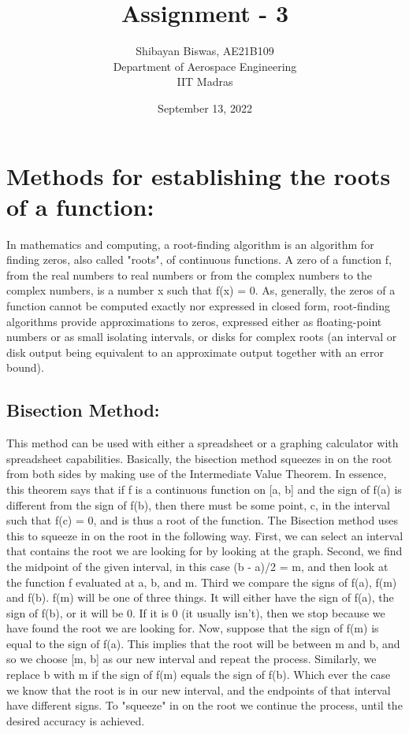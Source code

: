 \documentclass[12pt,a4paper]{article}
\author{Shibayan Biswas, AE21B109\\ Department of Aerospace Engineering\\ IIT Madras}
\title{Assignment - 3}
\date{September 13, 2022}
\begin{document}
\maketitle
\section{Methods for establishing the roots of a function:}
In mathematics and computing, a root-finding algorithm is an algorithm for finding zeros, also called "roots", of continuous functions. A zero of a function f, from the real numbers to real numbers or from the complex numbers to the complex numbers, is a number x such that f(x) = 0. As, generally, the zeros of a function cannot be computed exactly nor expressed in closed form, root-finding algorithms provide approximations to zeros, expressed either as floating-point numbers or as small isolating intervals, or disks for complex roots (an interval or disk output being equivalent to an approximate output together with an error bound).
\subsection{Bisection Method:}
This method can be used with either a spreadsheet or a graphing calculator with spreadsheet capabilities. Basically, the bisection method squeezes in on the root from both sides by making use of the Intermediate Value Theorem. In essence, this theorem says that if f is a continuous function on [a, b] and the sign of f(a) is different from the sign of f(b), then there must be some point, c, in the interval such that f(c) = 0, and is thus a root of the function. The Bisection method uses this to squeeze in on the root in the following way. First, we can select an interval that contains the root we are looking for by looking at the graph. Second, we find the midpoint of the given interval, in this case (b - a)/2 = m, and then look at the function f evaluated at a, b, and m. Third we compare the signs of f(a), f(m) and f(b). f(m) will be one of three things. It will either have the sign of f(a), the sign of f(b), or it will be 0. If it is 0 (it usually isn't), then we stop because we have found the root we are looking for. Now, suppose that the sign of f(m) is equal to the sign of f(a). This implies that the root will be between m and b, and so we choose [m, b] as our new interval and repeat the process. Similarly, we replace b with m if the sign of f(m) equals the sign of f(b). Which ever the case we know that the root is in our new interval, and the endpoints of that interval have different signs. To "squeeze" in on the root we continue the process, until the desired accuracy is achieved.
\end{document}
